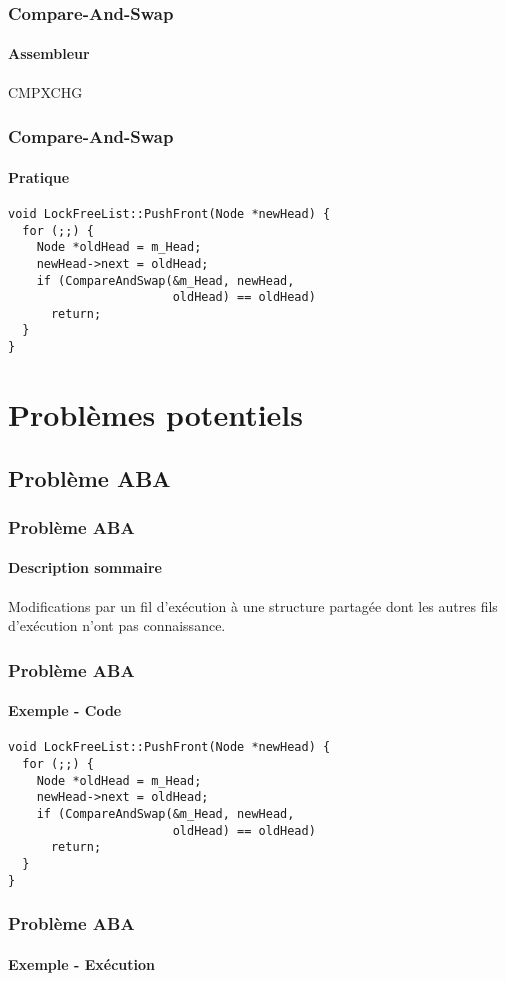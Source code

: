\documentclass{beamer}
\begin{document}
\begin{frame}[fragile]
\frametitle{Compare-And-Swap}
\framesubtitle{Assembleur}
\begin{center}
\Huge CMPXCHG
\end{center}
\end{frame}

\begin{frame}[fragile]
\frametitle{Compare-And-Swap}
\framesubtitle{Pratique}
\begin{lstlisting}
void LockFreeList::PushFront(Node *newHead) {
  for (;;) {
    Node *oldHead = m_Head;
    newHead->next = oldHead;
    if (CompareAndSwap(&m_Head, newHead, 
                       oldHead) == oldHead)
      return;
  }
}
\end{lstlisting}
\end{frame}

\section{Problèmes potentiels}
\subsection{Problème ABA}
\begin{frame}
\frametitle{Problème ABA}
\framesubtitle{Description sommaire}
Modifications par un fil d'exécution à une structure partagée dont les autres fils d'exécution n'ont pas connaissance.
\end{frame}

\begin{frame}[fragile]
\frametitle{Problème ABA}
\framesubtitle{Exemple - Code}
\begin{lstlisting}
void LockFreeList::PushFront(Node *newHead) {
  for (;;) {
    Node *oldHead = m_Head;
    newHead->next = oldHead;
    if (CompareAndSwap(&m_Head, newHead, 
                       oldHead) == oldHead)
      return;
  }
}
\end{lstlisting}
\end{frame}

\begin{frame}
\frametitle{Problème ABA}
\framesubtitle{Exemple - Exécution}
\end{frame}
\end{document}
